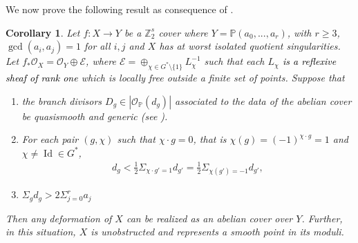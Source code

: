 \documentclass[12pt,twoside,]{amsart}
\theoremstyle{plain}
\newtheorem{corollary}[theorem]{Corollary}
\theoremstyle{definition}
\begin{document}
We now prove the following result as consequence of .

\begin{corollary}\label{every def is an abelian cover over a WPS}
Let $f: X \to Y$ be a $\mathbb{Z}_2^s$ cover where $Y = \mathbb{P}(a_0,...,a_r)$, with $r \geq 3$, $\operatorname{gcd}(a_i, a_j) = 1$ for all $i,j$ and $X$ has at worst isolated quotient singularities. Let $f_*\mathcal{O}_X = \mathcal{O}_Y \oplus \mathcal{E}$, where $\mathcal{E} = \oplus_{\chi \in G^*\setminus \{1\}} L_{\chi}^{-1}$ such that each $L_{\chi}$ 
\textcolor{black}{is a reflexive sheaf of rank one} which is locally free outside a finite set of points. Suppose that 
    \begin{enumerate}
        \item the branch divisors $D_g \in | \mathcal{O}_{\mathbb{P}}(d_g)|$ associated to the data of the abelian cover be quasismooth and generic (see ).
        
        \item For each pair $(g, \chi)$ such that $\chi \cdot g = 0$, 
        that is $\chi(g) =  (-1)^{\chi \cdot g} = 1$
        and $\chi \neq \operatorname{Id} \in G^*$, 
        \begin{align*}
        d_g < \displaystyle\frac{1}{2} \Sigma_{\chi \cdot g' = 1} d_{g'}
        =
        \displaystyle\frac{1}{2} 
        \Sigma_{\chi(g') = -1} d_{g'},
        \end{align*}

        \item $\Sigma_g d_g > 2 \Sigma_{j=0}^r a_j$
    \end{enumerate}

Then any deformation of $X$ can be realized as an abelian cover over $Y$. Further, in this situation, $X$ is unobstructed and represents a smooth point in its moduli.
    
\end{corollary}
\end{document}
